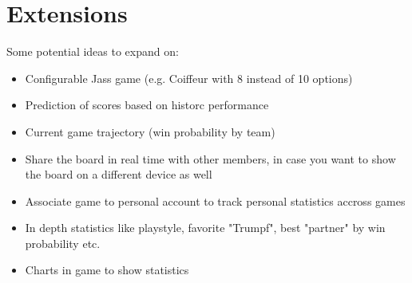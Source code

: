 
\section*{Extensions}
Some potential ideas to expand on:
\begin{itemize}
    \item Configurable Jass game (e.g. Coiffeur with 8 instead of 10 options)
    \item Prediction of scores based on historc performance
    \item Current game trajectory (win probability by team)
    \item Share the board in real time with other members, in case you want to show the board on a different device as well
    \item Associate game to personal account to track personal statistics accross games
    \item In depth statistics like playstyle, favorite "Trumpf", best "partner" by win probability etc.
    \item Charts in game to show statistics
\end{itemize}
